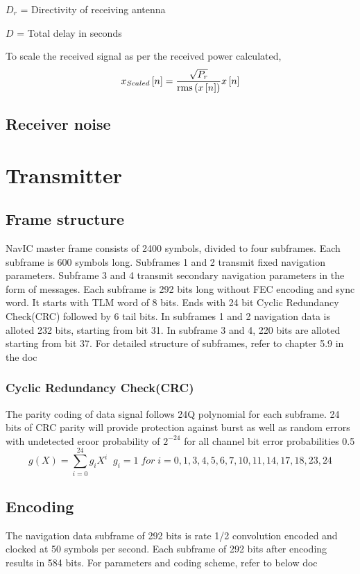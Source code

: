 \documentclass[10pt]{book}
\begin{document}
$D_r$ = Directivity of receiving antenna 

$D$ = Total delay in seconds

To scale the received signal as per the received power calculated,
\begin{equation}
    x_{Scaled}{}\left[n\right] = \frac{\sqrt{P_r}}{\operatorname{rms}\left(x{}\left[n\right]\right)}x{}\left[n\right]
\end{equation}   

\section{Receiver noise}

\chapter{Transmitter}

\section{Frame structure}
NavIC master frame consists of 2400 symbols, divided to four subframes. Each subframe is 600 symbols long. Subframes 1 and 2 transmit fixed navigation parameters. Subframe 3 and 4 transmit secondary navigation parameters in the form of messages. Each subframe is 292 bits long without FEC encoding and sync word. It starts with TLM word of 8 bits. Ends with 24 bit Cyclic Redundancy Check(CRC) followed by 6 tail bits. In subframes 1 and 2 navigation data is alloted 232 bits, starting from bit 31. In subframe 3 and 4, 220 bits are alloted starting from bit 37. For detailed structure of subframes, refer to chapter 5.9 in the doc
\subsection{Cyclic Redundancy Check(CRC)}
The parity coding of data signal follows 24Q polynomial for each subframe. 24 bits of CRC parity will provide protection against burst as well as random errors with undetected eroor probability of $2^{-24}$ for all channel bit error probabilities 0.5
\begin{equation}
    g(X) = \sum_{i = 0}^{24}g_{i}X^i\;\;
    g_{i}=1\; for\; i = 0,1,3,4,5,6,7,10,11,14,17,18,23,24
\end{equation}
\section{Encoding}
The navigation data subframe of 292 bits is rate 1/2 convolution encoded and clocked at 50 symbols per second. Each subframe of 292 bits after encoding results in 584 bits. For parameters and coding scheme, refer to below doc
\end{document}
